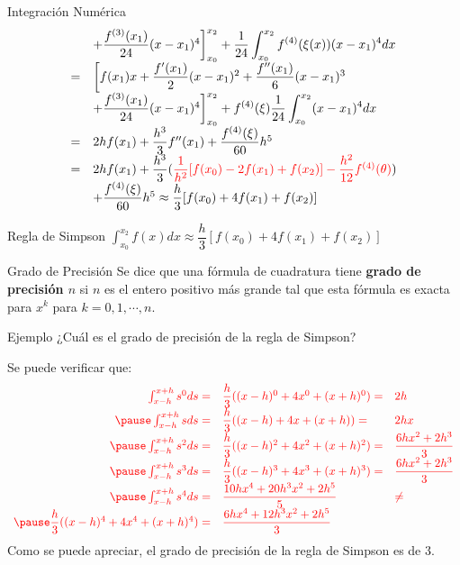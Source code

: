 \begin{frame}[allowframebreaks]{Integración Numérica}
\begin{displaymath}
\begin{array}{rl}
&+\dfrac{f^{(3)}(x_1)}{24}(x-x_1)^4\bigg]_{x_0}^{x_2}+\dfrac{1}{24}\displaystyle \int_{x_0}^{x_2}f^{(4)}(\xi(x))(x-x_1)^4dx\\
=&\bigg[f(x_1)x+\dfrac{f'(x_1)}{2}(x-x_1)^2+\dfrac{f''(x_1)}{6}(x-x_1)^3\\
&+\dfrac{f^{(3)}(x_1)}{24}(x-x_1)^4\bigg]_{x_0}^{x_2}+\displaystyle f^{(4)}(\xi)\dfrac{1}{24}\int_{x_0}^{x_2}(x-x_1)^4dx\\
=&2hf(x_1)+\dfrac{h^3}{3}f''(x_1)+\dfrac{f^{(4)}(\xi)}{60}h^5\\
=&2hf(x_1)+\dfrac{h^3}{3}(\textcolor{red}{\dfrac{1}{h^2}[f(x_0)-2f(x_1)+f(x_2)]-\dfrac{h^{2}}{12}f^{(4)}(\theta)})\\
&+\dfrac{f^{(4)}(\xi)}{60}h^5\approx \dfrac{h}{3}[f(x_0)+4f(x_1)+f(x_2)]
\end{array}
\end{displaymath}
\begin{block}{Regla de Simpson}
\centering $\displaystyle \int_{x_0}^{x_2} f(x)dx\approx \dfrac{h}{3}[f(x_0)+4f(x_1)+f(x_2)]$
\end{block}
\small
\begin{block}{Grado de Precisión}
Se dice que una fórmula de cuadratura tiene \textbf{grado de precisión $n$} si $n$ es el entero positivo más grande tal que esta fórmula es exacta para $x^k$ para $k=0,1,\cdots, n$.  
\end{block}\pause
\begin{block}{Ejemplo}
¿Cuál es el grado de precisión de la regla de Simpson?
\end{block}\pause
Se puede verificar que:\pause
\vspace*{-0.5cm}
\begin{displaymath}
\textcolor{red}{
\begin{array}{rll}
\int_{x-h}^{x+h}s^0ds=&\dfrac{h}{3}((x-h)^0+4x^0+(x+h)^0)=&2h\\\pause
\int_{x-h}^{x+h}sds=&\dfrac{h}{3}((x-h)+4x+(x+h))=&2hx\\\pause
\int_{x-h}^{x+h}s^2ds=&\dfrac{h}{3}((x-h)^2+4x^2+(x+h)^2)=&\dfrac{6hx^2+2h^3}{3}\\\pause
\int_{x-h}^{x+h}s^3ds=&\dfrac{h}{3}((x-h)^3+4x^3+(x+h)^3)=&\dfrac{6hx^2+2h^3}{3}\\\pause
\int_{x-h}^{x+h}s^4ds=&\dfrac{10hx^4+20h^3x^2+2h^5}{5}&\neq\\\pause
\dfrac{h}{3}((x-h)^4+4x^4+(x+h)^4)=&\dfrac{6hx^4+12h^3x^2+2h^5}{3}&
\end{array}}
\end{displaymath} 
\scriptsize
Como se puede apreciar, el grado de precisión de la regla de Simpson es de 3.

\end{frame}
